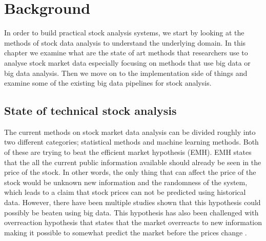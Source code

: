 \chapter{Background}
\label{chapter:background} 



In order to build practical stock analysis systems, we start by looking at the methods of stock data analysis to understand the underlying domain.
In this chapter we examine what are the state of art methods that researchers use to analyse stock market data especially focusing on methods that use big data or big data analysis.
Then we move on to the implementation side of things and examine some of the existing big data pipelines for stock analysis.


\section{State of technical stock analysis}

The current methods on stock market data analysis can be divided roughly into two different categories; statistical methods and machine learning methods.
Both of these are trying to beat the efficient market hypothesis (EMH).
EMH states that the all the current public information available should already be seen in the price of the stock.
In other words, the only thing that can affect the price of the stock would be unknown new information and the randomness of the system, which leads to a claim that stock prices can not be predicted using historical data.
However, there have been multiple studies shown that this hypothesis could possibly be beaten using big data. \cite{nam}
This hypothesis has also been challenged with overreaction hypothesis that states that the market overreacts to new information making it possible to somewhat predict the market before the prices change \cite{day}.

